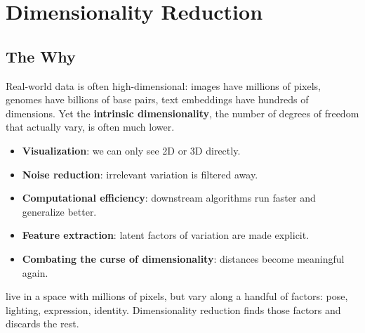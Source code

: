 
\chapter{Dimensionality Reduction}


\section{The Why}

Real-world data is often high-dimensional: images have millions of pixels, genomes have billions of base pairs, text embeddings have hundreds of dimensions.
Yet the \textbf{intrinsic dimensionality}, the number of degrees of freedom that actually vary, is often much lower.


\begin{itemize}
    \item \textbf{Visualization}: we can only see 2D or 3D directly.
    \item \textbf{Noise reduction}: irrelevant variation is filtered away.
    \item \textbf{Computational efficiency}: downstream algorithms run faster and generalize better.
    \item \textbf{Feature extraction}: latent factors of variation are made explicit.
    \item \textbf{Combating the curse of dimensionality}: distances become meaningful again.
\end{itemize}

 live in a space with millions of pixels, but vary along a handful of factors: pose, lighting, expression, identity.
Dimensionality reduction finds those factors and discards the rest.


